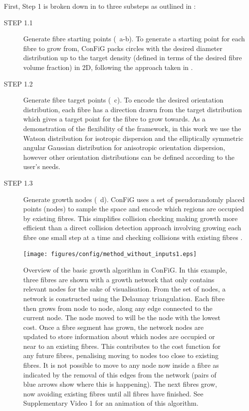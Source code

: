 First, Step 1 is broken down in to three substeps as outlined in :
\begin{description}
  \item [STEP 1.1] Generate fibre starting points (~a-b). To generate a starting point for each fibre to grow from, ConFiG packs circles with the desired diameter distribution up to the target density (defined in terms of the desired fibre volume fraction) in 2D, following the approach taken in \cite{Hall2009}.

  \item [STEP 1.2] Generate fibre target points (~c). To encode the desired orientation distribution, each fibre has a direction drawn from the target distribution which gives a target point for the fibre to grow towards. As a demonstration of the flexibility of the framework, in this work we use the Watson distribution \cite{Mardia2008} for isotropic dispersion and the elliptically symmetric angular Gaussian distribution \cite{Paine2018} for anisotropic orientation dispersion, however other orientation distributions can be defined according to the user’s needs.

  \item [STEP 1.3] Generate growth nodes (~d). ConFiG uses a set of pseudorandomly placed points (nodes) to sample the space and encode which regions are occupied by existing fibres. This simplifies collision checking making growth more efficient than a direct collision detection approach involving growing each fibre one small step at a time and checking collisions with existing fibres \cite{Callaghan2019}.
\end{description}

\begin{figure}[h!]
  \centering
  \texttt{[image: figures/config/method\_without\_inputs1.eps]}
  \caption[Overview of the ConFiG growth algorithm]{Overview of the basic growth algorithm in ConFiG. In this example, three fibres are shown with a growth network that only contains relevant nodes for the sake of visualisation.  From the set of nodes, a network is constructed using the Delaunay triangulation. Each fibre then grows from node to node, along any edge connected to the current node. The node moved to will be the node with the lowest cost. Once a fibre segment has grown, the network nodes are updated to store information about which nodes are occupied or near to an existing fibres. This contributes to the cost function for any future fibres, penalising moving to nodes too close to existing fibres.  It is not possible to move to any node now inside a fibre as indicated by the removal of this edges from the network (pairs of blue arrows show where this is happening). The next fibres grow, now avoiding existing fibres until all fibres have finished. See Supplementary Video 1 for an animation of this algorithm. }
  \label{fig:config_algorithm}
\end{figure}

